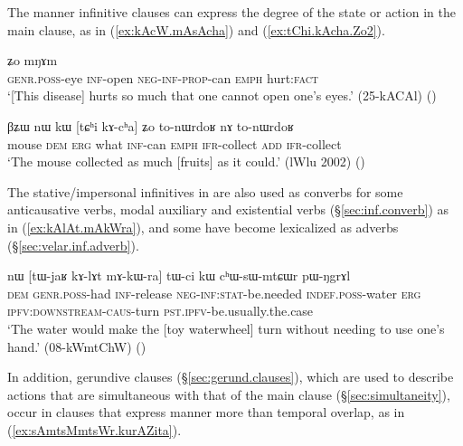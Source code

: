 The manner infinitive clauses can express the degree of the state or action in the main clause, as in (\ref{ex:kAcW.mAsAcha}) and (\ref{ex:tChi.kAcha.Zo2}). 

\begin{exe}
\ex \label{ex:kAcW.mAsAcha}
 ʑo mŋɤm  \\
\textsc{genr}.\textsc{poss}-eye \textsc{inf}-open \textsc{neg}-\textsc{inf}-\textsc{prop}-can \textsc{emph} hurt:\textsc{fact} \\
\glt `[This disease] hurts so much that one cannot open one's eyes.' (25-kACAl)
()
\end{exe}

\begin{exe}
\ex \label{ex:tChi.kAcha.Zo2}
\gll βʑɯ nɯ kɯ [tɕʰi kɤ-cʰa] ʑo to-nɯrdoʁ nɤ to-nɯrdoʁ \\
mouse \textsc{dem} \textsc{erg} what \textsc{inf}-can \textsc{emph} \textsc{ifr}-collect \textsc{add} \textsc{ifr}-collect \\
\glt `The mouse collected as much [fruits] as it could.' (lWlu 2002)
()
\end{exe}


The stative/impersonal infinitives in  are also used as converbs for some anticausative verbs, modal auxiliary and existential verbs (§\ref{sec:inf.converb}) as in (\ref{ex:kAlAt.mAkWra}), and some have become lexicalized as adverbs (§\ref{sec:velar.inf.adverb}).

\begin{exe}
\ex \label{ex:kAlAt.mAkWra}
\gll nɯ [tɯ-jaʁ kɤ-lɤt mɤ-kɯ-ra] tɯ-ci kɯ cʰɯ-sɯ-mtɕɯr pɯ-ŋgrɤl \\
\textsc{dem} \textsc{genr}.\textsc{poss}-had \textsc{inf}-release \textsc{neg}-\textsc{inf}:\textsc{stat}-be.needed \textsc{indef}.\textsc{poss}-water \textsc{erg} \textsc{ipfv}:\textsc{downstream}-\textsc{caus}-turn \textsc{pst}.\textsc{ipfv}-be.usually.the.case \\
\glt `The water would make the [toy waterwheel] turn without needing to use one's hand.' (08-kWmtChW)
()
\end{exe}

In addition, gerundive clauses (§\ref{sec:gerund.clauses}), which are used to describe actions that are simultaneous with that of the main clause (§\ref{sec:simultaneity}), occur in clauses that express manner more than temporal overlap, as in (\ref{ex:sAmtsMmtsWr.kurAZita}).

